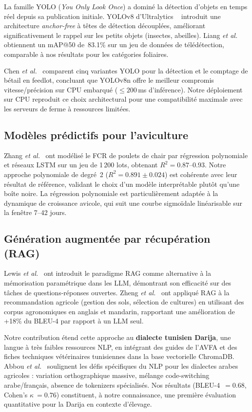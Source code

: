 La famille YOLO (\textit{You Only Look Once}) a dominé la détection
d'objets en temps réel depuis sa publication initiale. YOLOv8 d'Ultralytics
~\cite{yolov8_2023} introduit une architecture \textit{anchor-free} à têtes
de détection découplées, améliorant significativement le rappel sur les
petits objets (insectes, abeilles). Liang \textit{et al.}~\cite{liang2023}
obtiennent un mAP@50 de~83.1\% sur un jeu de données de télédétection,
comparable à nos résultats pour les catégories foliaires.

Chen \textit{et al.}~\cite{chen2023yolo_livestock} comparent cinq variantes
YOLO pour la détection et le comptage de bétail en feedlot, concluant que
YOLOv8n offre le meilleur compromis vitesse/précision sur CPU embarqué
($\leq 200$\,ms d'inférence). Notre déploiement sur CPU reproduit ce
choix architectural pour une compatibilité maximale avec les serveurs
de ferme à ressources limitées.

\subsection{Modèles prédictifs pour l'aviculture}

Zhang \textit{et al.}~\cite{zhang2023fcr} ont modélisé le FCR de poulets
de chair par régression polynomiale et réseaux LSTM sur un jeu de 1\,200
lots, obtenant $R^2 = 0.87$--$0.93$. Notre approche polynomiale de degré~2
($R^2 = 0.891 \pm 0.024$) est cohérente avec leur résultat de référence,
validant le choix d'un modèle interprétable plutôt qu'une boîte noire.
La régression polynomiale est particulièrement adaptée à la dynamique de
croissance avicole, qui suit une courbe sigmoïdale linéarisable sur la
fenêtre 7--42 jours.

\subsection{Génération augmentée par récupération (RAG)}

Lewis \textit{et al.}~\cite{lewis2020rag} ont introduit le paradigme RAG
comme alternative à la mémorisation paramétrique dans les LLM, démontrant
son efficacité sur des tâches de questions-réponses ouvertes. Zheng
\textit{et al.}~\cite{zheng2024rag_agri} ont appliqué RAG à la
recommandation agricole (gestion des sols, sélection de cultures) en
utilisant des corpus agronomiques en anglais et mandarin, rapportant une
amélioration de +18\% du BLEU-4 par rapport à un LLM seul.

Notre contribution étend cette approche au \textbf{dialecte tunisien Darija},
une langue à très faibles ressources NLP, en intégrant des guides de l'AVFA
et des fiches techniques vétérinaires tunisiennes dans la base vectorielle
ChromaDB. Abbou \textit{et al.}~\cite{abbou2024arabic} soulignent les défis
spécifiques du NLP pour les dialectes arabes agricoles : variation
orthographique massive, mélange code-switching arabe/français, absence de
tokenizers spécialisés. Nos résultats (BLEU-4~$= 0.68$, Cohen's $\kappa~= 0.76$)
constituent, à notre connaissance, une première évaluation quantitative pour
la Darija en contexte d'élevage.

